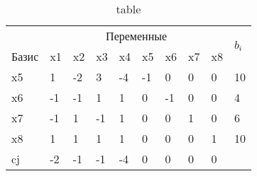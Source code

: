 \setcounter{chapter}{0} %

\noindent %

\begin{table}
	\caption{table}
	\begin{tabular}{|l|l|l|l|l|l|l|l|l|l|}
		\hline
		      & \multicolumn{8}{|c|}{Переменные}                                                        & \multirow{2}{4em}{$b_i$}\\
		\cline{1-9}
		Базис & x1                               & x2                     & x3 & x4 & x5 & x6 & x7 & x8 &    \\
		\hline
		x5    & 1                                & -2                     & 3  & -4 & -1 & 0  & 0  & 0  & 10 \\
		\hline
		x6    & -1                               & -1                     & 1  & 1  & 0  & -1 & 0  & 0  & 4  \\
		\hline
		x7    & -1                               & 1                      & -1 & 1  & 0  & 0  & 1  & 0  & 6  \\
		\hline
		x8    & 1                                & 1                      & 1  & 1  & 0  & 0  & 0  & 1  & 10 \\
		\hline
		cj    & -2                               & -1                     & -1 & -4 & 0  & 0  & 0  & 0  &    \\
		\hline
	\end{tabular}
	\label{table}
\end{table}